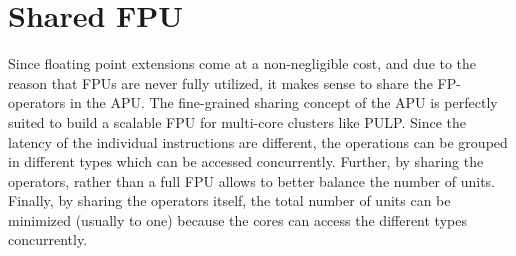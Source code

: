 \documentclass[%
 oneside,      %
 openany,      %
 halfparskip,  %
]{scrbook}
\begin{document}
\section{Shared FPU}\label{apu_fpu}

Since floating point extensions come at a non-negligible cost, and due to the reason that FPUs are never fully utilized, it makes sense to share the FP-operators in the APU. The fine-grained sharing concept of the APU is perfectly suited to build a scalable FPU for multi-core clusters like PULP. Since the latency of the individual instructions are different, the operations can be grouped in different types which can be accessed concurrently. Further, by sharing the operators, rather than a full FPU allows to better balance the number of units. Finally, by sharing the operators itself, the total number of units can be minimized (usually to one) because the cores can access the different types concurrently.
\end{document}
